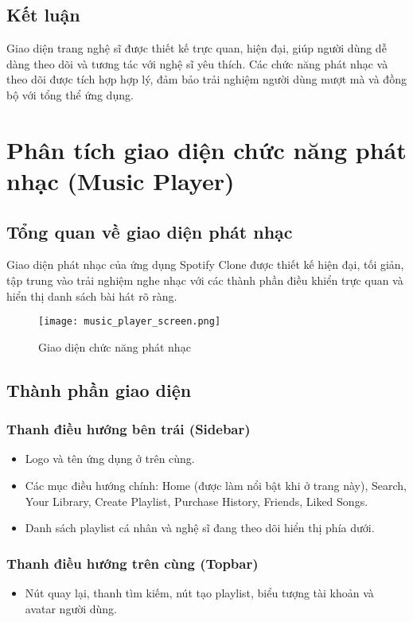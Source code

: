 \documentclass{book}
\let\oldsection\section
\renewcommand{\section}{\clearpage\oldsection}
\begin{document}
\subsection{Kết luận}
Giao diện trang nghệ sĩ được thiết kế trực quan, hiện đại, giúp người dùng dễ dàng theo dõi và tương tác với nghệ sĩ yêu thích. Các chức năng phát nhạc và theo dõi được tích hợp hợp lý, đảm bảo trải nghiệm người dùng mượt mà và đồng bộ với tổng thể ứng dụng.

\section{Phân tích giao diện chức năng phát nhạc (Music Player)}

\subsection{Tổng quan về giao diện phát nhạc}
Giao diện phát nhạc của ứng dụng Spotify Clone được thiết kế hiện đại, tối giản, tập trung vào trải nghiệm nghe nhạc với các thành phần điều khiển trực quan và hiển thị danh sách bài hát rõ ràng.

\begin{figure}[h!]
\centering
\texttt{[image: music\_player\_screen.png]} %
\caption{Giao diện chức năng phát nhạc}
\label{fig:musicplayer}
\end{figure}

\subsection{Thành phần giao diện}

\subsubsection{Thanh điều hướng bên trái (Sidebar)}
\begin{itemize}
    \item Logo và tên ứng dụng ở trên cùng.
    \item Các mục điều hướng chính: Home (được làm nổi bật khi ở trang này), Search, Your Library, Create Playlist, Purchase History, Friends, Liked Songs.
    \item Danh sách playlist cá nhân và nghệ sĩ đang theo dõi hiển thị phía dưới.
\end{itemize}

\subsubsection{Thanh điều hướng trên cùng (Topbar)}
\begin{itemize}
    \item Nút quay lại, thanh tìm kiếm, nút tạo playlist, biểu tượng tài khoản và avatar người dùng.
\end{itemize}
\end{document}
